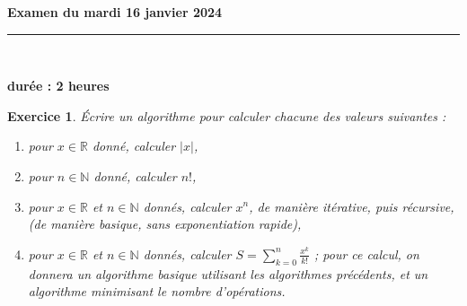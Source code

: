 \documentclass[11pt,a4paper]{article}
\title{}
\date{}
\newtheorem{ex}{Exercice}
\newcommand{\HRule}{\rule{\linewidth}{0.5mm}}
\begin{document}
\pagestyle{fancy}

\fancyhead{}
 \fancyfoot{}


\newcommand{\lb}{\llbracket}
\newcommand{\rb}{\rrbracket}
\newcommand{\N}{\mathbb{N}}
\newcommand{\Z}{\mathbb{Z}}
\newcommand{\R}{\mathbb{R}}




\newcommand{\md}[3]{#1\ \equiv \ #2 \! \! \! \! \! \pmod {#3} }
\newcommand{\nmd}[3]{#1 \not \equiv #2 \! \! \! \! \!  \pmod {#3} }
\newcommand{\mda}[3]{#1 \equiv #2 \! \!  \pmod {#3} }
\newcommand{\nmda}[3]{#1 \not \equiv #2 \! \! \pmod {#3} }
\newcommand{\mo}[2]{#1 \! \! \! \! \! \pmod #2 }
\newcommand{\moa}[2]{#1 \! \!  \pmod {#2} }

\thispagestyle{fancy}

\begin{center}
    { \huge \bfseries
Examen  du mardi 16 janvier 2024
     \\ [0cm] }
    \HRule \\[0.5cm]
\end{center}

\begin{center}
\textbf{durée : 2 heures}
\end{center}

\begin{ex}\label{prelim}
Écrire un algorithme pour calculer chacune des valeurs suivantes : 
\begin{enumerate}
\item pour $x\in\R$ donné, calculer $|x|$,
\item pour $n\in\N$ donné, calculer $n!$,
\item pour $x\in\R$ et $n\in\N$ donnés, calculer $x^n$, de manière itérative, puis récursive, (de manière basique, sans exponentiation rapide),
\item pour $x\in\R$ et $n\in\N$ donnés, calculer $S = \sum_{k=0}^n
  \frac{x^k}{k!}$ ; pour ce calcul, on donnera un algorithme basique  utilisant les algorithmes précédents,
  et un algorithme minimisant le nombre d'opérations. 
\end{enumerate}
\end{ex}
\end{document}
